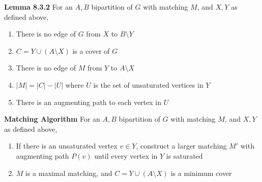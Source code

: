 \documentclass[11pt,notitlepage]{report}
\newcommand{\tbf}[1]{\textbf{#1}}
\begin{document}
\tbf{Lemma 8.3.2} For an $A, B$ bipartition of $G$ with matching $M$, and $X, Y$ as defined above,
\vspace{-9mm}
\begin{enumerate}[label=(\alph*)]
    \item There is no edge of $G$ from $X$ to $B \setminus Y$
    \vspace{-2mm}
    \item $C = Y \cup (A \setminus X)$ is a cover of $G$
    \vspace{-2mm}
    \item There is no edge of $M$ from $Y$ to $A \setminus X$
    \vspace{-2mm}
    \item $|M| = |C| - |U|$ where $U$ is the set of unsaturated vertices in $Y$
    \vspace{-2mm}
    \item There is an augmenting path to each vertex in $U$
\end{enumerate}
\vspace{-3mm}

\tbf{Matching Algorithm} For an $A, B$ bipartition of $G$ with matching $M$, and $X, Y$ as defined above,
\vspace{-4mm}
\begin{enumerate}[label=(Step \arabic*)]
    \item If there is an unsaturated vertex $v \in Y$, construct a larger matching $M'$ with augmenting path $P(v)$ until every vertex in $Y$ is saturated
    \vspace{-2mm}
    \item $M$ is a maximal matching, and $C = Y \cup (A \setminus X)$ is a minimum cover 
\end{enumerate}
\vspace{-3mm}
\end{document}
